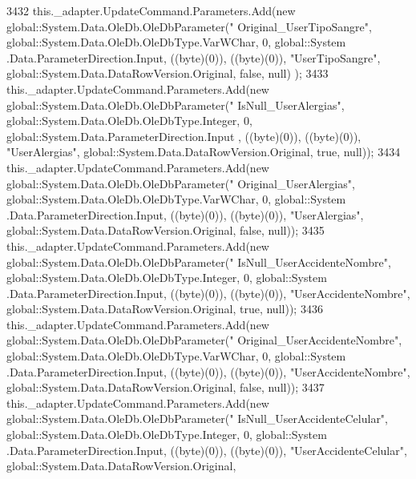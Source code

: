 \begin{DoxyCode}
3432             this.\_adapter.UpdateCommand.Parameters.Add(\textcolor{keyword}{new} global::System.Data.OleDb.OleDbParameter(\textcolor{stringliteral}{"
      Original\_UserTipoSangre"}, global::System.Data.OleDb.OleDbType.VarWChar, 0, global::System
      .Data.ParameterDirection.Input, ((byte)(0)), ((byte)(0)), \textcolor{stringliteral}{"UserTipoSangre"}, global::System.Data.DataRowVersion.Original, \textcolor{keyword}{false}, null)
      );
3433             this.\_adapter.UpdateCommand.Parameters.Add(\textcolor{keyword}{new} global::System.Data.OleDb.OleDbParameter(\textcolor{stringliteral}{"
      IsNull\_UserAlergias"}, global::System.Data.OleDb.OleDbType.Integer, 0, global::System.Data.ParameterDirection.Input
      , ((byte)(0)), ((byte)(0)), \textcolor{stringliteral}{"UserAlergias"}, global::System.Data.DataRowVersion.Original, \textcolor{keyword}{true}, null));
3434             this.\_adapter.UpdateCommand.Parameters.Add(\textcolor{keyword}{new} global::System.Data.OleDb.OleDbParameter(\textcolor{stringliteral}{"
      Original\_UserAlergias"}, global::System.Data.OleDb.OleDbType.VarWChar, 0, global::System
      .Data.ParameterDirection.Input, ((byte)(0)), ((byte)(0)), \textcolor{stringliteral}{"UserAlergias"}, global::System.Data.DataRowVersion.Original, \textcolor{keyword}{false}, null));
3435             this.\_adapter.UpdateCommand.Parameters.Add(\textcolor{keyword}{new} global::System.Data.OleDb.OleDbParameter(\textcolor{stringliteral}{"
      IsNull\_UserAccidenteNombre"}, global::System.Data.OleDb.OleDbType.Integer, 0, global::System
      .Data.ParameterDirection.Input, ((byte)(0)), ((byte)(0)), \textcolor{stringliteral}{"UserAccidenteNombre"}, global::System.Data.DataRowVersion.Original, \textcolor{keyword}{true},
       null));
3436             this.\_adapter.UpdateCommand.Parameters.Add(\textcolor{keyword}{new} global::System.Data.OleDb.OleDbParameter(\textcolor{stringliteral}{"
      Original\_UserAccidenteNombre"}, global::System.Data.OleDb.OleDbType.VarWChar, 0, global::System
      .Data.ParameterDirection.Input, ((byte)(0)), ((byte)(0)), \textcolor{stringliteral}{"UserAccidenteNombre"}, global::System.Data.DataRowVersion.Original, \textcolor{keyword}{
      false}, null));
3437             this.\_adapter.UpdateCommand.Parameters.Add(\textcolor{keyword}{new} global::System.Data.OleDb.OleDbParameter(\textcolor{stringliteral}{"
      IsNull\_UserAccidenteCelular"}, global::System.Data.OleDb.OleDbType.Integer, 0, global::System
      .Data.ParameterDirection.Input, ((byte)(0)), ((byte)(0)), \textcolor{stringliteral}{"UserAccidenteCelular"}, global::System.Data.DataRowVersion.Original, \textcolor{keyword}{
}
\end{DoxyCode}
